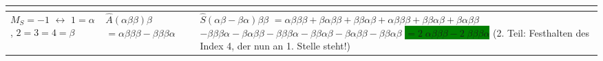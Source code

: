 \documentclass[12pt,a4paper]{article}
\begin{document}
\begin{table}[H]
\begin{tabular}{|p{2cm}|p{7cm}|p{7cm}|}
{ }
  \\ \hline 
  $M_S = -1$ $\leftrightarrow$ $1=\alpha$, $2=3=4=\beta$ & 
  \parbox[t][2em]{7cm}{
  $\hat{A}\left(\alpha\beta\beta\right)\beta $ \\
  $ = \alpha\beta\beta\beta - \beta\beta\beta\alpha 
   $
  }
   & \parbox[t][10em]{7cm}{
   $ \hat{S}\left( \alpha\beta - \beta \alpha\right) \beta\beta$ \\
   $ = \alpha\beta\beta\beta + \beta\alpha\beta\beta+  \beta\beta\alpha\beta
   + \alpha\beta\beta\beta + \beta\beta\alpha\beta + \beta\alpha\beta\beta$ \\
   $ - \beta\beta\beta\alpha - \beta\alpha\beta\beta - \beta\beta\beta\alpha 
   - \beta\beta\alpha\beta - \beta\alpha\beta\beta - \beta\beta\alpha\beta 
    $  \\
\colorbox{green}{  $ = 2\;\alpha\beta\beta\beta - 2\;\beta\beta\beta\alpha $} 
   \\ (2. Teil: Festhalten des Index 4, der nun an 1. Stelle steht!)
    }
  \\ \hline 
\end{tabular}
\end{table}
\end{document}

